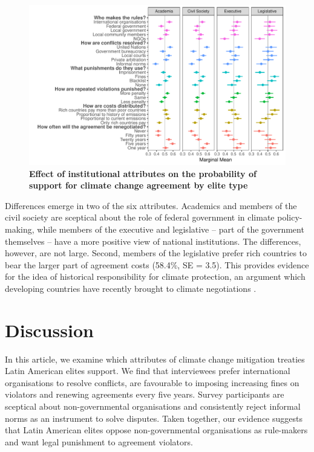 \documentclass[a4paper,12pt]{article}
\begin{document}
\begin{figure}[H]
	\centering
	\includegraphics[width=\linewidth]{types.pdf}
	\caption{\textbf{Effect of institutional attributes on the probability of support for climate change agreement by elite type}}
	\label{fig:types}
\end{figure}

Differences emerge in two of the six attributes. Academics and members of the civil society are sceptical about the role of federal government in climate policy-making, while members of the executive and legislative -- part of the government themselves -- have a more positive view of national institutions. The differences, however, are not large. Second, members of the legislative prefer rich countries to bear the larger part of agreement costs (58.4\%, SE = 3.5). This provides evidence for the idea of historical responsibility for climate protection, an argument which developing countries have recently brought to climate negotiations \citep{muller2009differentiating,friman2015agreement}. 

\section{Discussion}%
\label{sec:discussion}

In this article, we examine which attributes of climate change mitigation treaties Latin American elites support. We find that interviewees prefer international organisations to resolve conflicts, are favourable to imposing increasing fines on violators and renewing agreements every five years. Survey participants are sceptical about non-governmental organisations and consistently reject informal norms as an instrument to solve disputes. Taken together, our evidence suggests that Latin American elites oppose non-governmental organisations as rule-makers and want legal punishment to agreement violators. 
\end{document}
